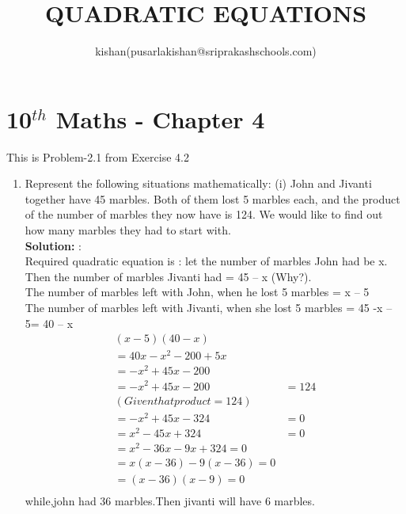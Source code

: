 \documentclass[10pt]{article}
\title{QUADRATIC EQUATIONS}
\author{kishan(pusarlakishan@sriprakashschools.com)}
\newcommand{\solution}{\noindent \textbf{Solution: }}
\begin{document}
    \maketitle
    \section*{10$^{th}$ Maths - Chapter 4}
    This is Problem-2.1 from Exercise 4.2
    \begin{enumerate}
    \item Represent the following situations mathematically:
(i) John and Jivanti together have 45 marbles. Both of them lost 5 marbles each, and
the product of the number of marbles they now have is 124. We would like to find
out how many marbles they had to start with.\\
\solution:\\Required quadratic equation is :
let the number of marbles John had be x.\\
Then the number of marbles Jivanti had = 45 – x (Why?).\\
The number of marbles left with John, when he lost 5 marbles = x – 5\\
The number of marbles left with Jivanti, when she lost 5 marbles = 45 -x – 5= 40 – x\\
 \begin{align}
(x-5)(40-x)\\
= 40x-x^2-200+5x\\
=-x^2+45x-200\\
=-x^2+45x-200 &= 124 \\(Given that product = 124)\\
=-x^2+45x-324 &= 0\\
=x^2-45x+324 &= 0\\
=x^2-36x-9x+324=0\\
=x(x-36)-9(x-36)=0\\
=(x-36)(x-9)=0\\
 \end{align}
while,john had 36 marbles.Then jivanti will have 6 marbles.
\end{enumerate}
\end{document}
